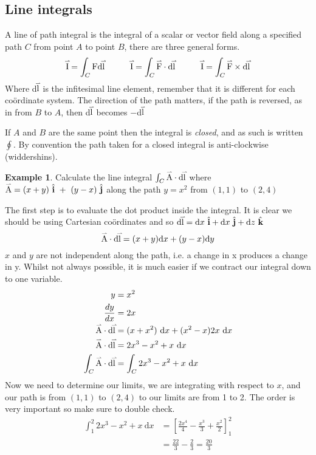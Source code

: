 \documentclass{article}
\newcommand{\coord}{co{\"o}rdinate }
\newcommand{\coords}{co{\"o}rdinates }
\newcommand{\ihat}{\ {\hat{\textbf{i}}}}
\newcommand{\jhat}{\ {\hat{\textbf{j}}}}
\newcommand{\khat}{\ {\hat{\textbf{k}}}}
\renewcommand{\d}{\text{d}}
\renewcommand{\vec}[1]{\accentset{\rightharpoonup}{\text{#1}}}
\theoremstyle{definition}
\newtheorem{example}{Example}[section]
\begin{document}
\subsection{Line integrals}

A line of path integral is the integral of a scalar or vector field along a specified path $C$ from point $A$
to point $B$, there are three general forms.
$$\vec{I} = \int_C \text{F} \d\vec{l} \qquad\quad \vec{I} = \int_C \vec{F}\cdot \d\vec{l} \qquad\quad \vec{I} = \int_C \vec{F}\times \d\vec{l}$$
Where d$\vec{l}$ is the infitesimal line element, remember that it is different for each \coord system.
The direction of the path matters, if the path is reversed, as in from $B$ to $A$, then d$\vec{l}$ becomes $-$d$\vec{l}$

If $A$ and $B$ are the same point then the integral is \emph{closed}, and as such is written $\oint$. By convention
the path taken for a closed integral is anti-clockwise (widdershins).

\begin{example}
    Calculate the line integral $\int_C \vec{A}\cdot \d\vec{l}$ where $\vec{A} = (x + y)\ihat\ +\ (y-x)\jhat$ along the path
    $y = x^2$ from $(1, 1)$ to $(2, 4)$

    The first step is to evaluate the dot product inside the integral. It is clear we should be using Cartesian 
    \coords and so $\d\vec{l} = \d x\ihat + \d x\jhat + \d z\khat$
    $$\vec{A}\cdot\d\vec{l} = (x + y)\d x + (y - x)\d y$$
    $x$ and $y$ are not independent along the path, i.e. a change in x produces a change in y.
    Whilst not always possible, it is much easier if we contract our integral down to one variable.
    \begin{align*}
        y &= x^2\\
        \frac{dy}{dx} &= 2x\\
        \vec{A}\cdot\d\vec{l} &= (x+x^2)\ \d x + (x^2-x)2x\ \d x\\
        \vec{A}\cdot\d\vec{l} &= 2x^3 - x^2 + x\ \d x\\
        \int_C \vec{A}\cdot \d\vec{l} &= \int_C 2x^3 - x^2 + x\ \d x
    \end{align*}
    Now we need to determine our limits, we are integrating with respect to $x$, and our path is from $(1, 1)$ to $(2, 4)$
    to our limits are from 1 to 2. The order is very important so make sure to double check.
    \begin{align*}
        \int_1^2 2x^3 - x^2 + x\ \d x &= \left[\frac{2x^4}{4}-\frac{x^3}{3}+\frac{x^2}{2}\right]_1^2\\
        &= \frac{22}{3} - \frac{2}{3} = \frac{20}{3}
    \end{align*}
\end{example}
\end{document}
